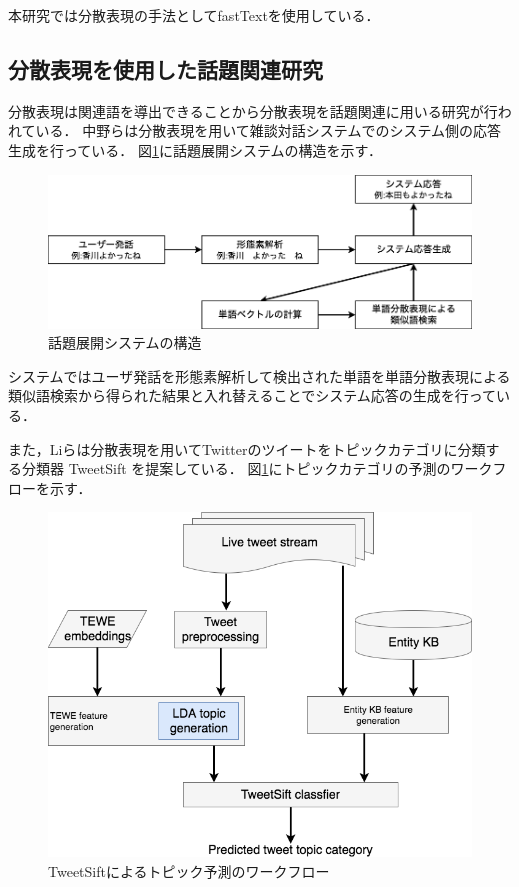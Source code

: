 本研究では分散表現の手法としてfastTextを使用している．
\subsection{分散表現を使用した話題関連研究}
分散表現は関連語を導出できることから分散表現を話題関連に用いる研究が行われている．
中野ら\cite{embedTopic1}は分散表現を用いて雑談対話システムでのシステム側の応答生成を行っている．
図\ref{Fig:embedTopic1}に話題展開システムの構造を示す．
\begin{figure}[htbp]
 \begin{center}
  \includegraphics[width=\textwidth]{../images/2.Related_Work/embedTopic1.png}
  \caption{話題展開システムの構造}
  \label{Fig:embedTopic1}
  \vspace{-10pt}
 \end{center}
\end{figure}

システムではユーザ発話を形態素解析して検出された単語を単語分散表現による類似語検索から得られた結果と入れ替えることでシステム応答の生成を行っている．

また，Liら\cite{embedTopic2}は分散表現を用いてTwitterのツイートをトピックカテゴリに分類する分類器 TweetSift を提案している．
図\ref{Fig:embedTopic1}にトピックカテゴリの予測のワークフローを示す．
\begin{figure}[htbp]
 \begin{center}
  \includegraphics[width=\textwidth]{../images/2.Related_Work/TweetSift.png}
  \caption{TweetSiftによるトピック予測のワークフロー}
  \label{Fig:tweetSift}
  \vspace{-10pt}
 \end{center}
\end{figure}


